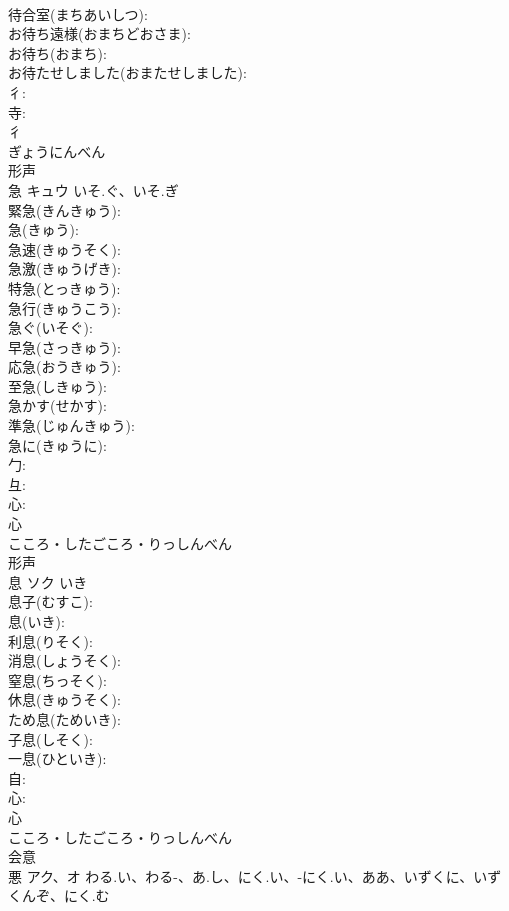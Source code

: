 \documentclass[8pt]{extreport}
\begin{document}
\begin{CJK}{UTF8}{min}
\\	待合室(まちあいしつ): 
\\	お待ち遠様(おまちどおさま): 
\\	お待ち(おまち): 
\\	お待たせしました(おまたせしました): 
\\	彳: 
\\	寺: 
\\	彳	
\\	ぎょうにんべん	
\\	形声 
\\	急	キュウ	いそ.ぐ、いそ.ぎ		
\\	緊急(きんきゅう): 
\\	急(きゅう): 
\\	急速(きゅうそく): 
\\	急激(きゅうげき): 
\\	特急(とっきゅう): 
\\	急行(きゅうこう): 
\\	急ぐ(いそぐ): 
\\	早急(さっきゅう): 
\\	応急(おうきゅう): 
\\	至急(しきゅう): 
\\	急かす(せかす): 
\\	準急(じゅんきゅう): 
\\	急に(きゅうに): 
\\	勹: 
\\	彑: 
\\	心: 
\\	心	
\\	こころ・したごころ・りっしんべん	
\\	形声 
\\	息	ソク	いき		
\\	息子(むすこ): 
\\	息(いき): 
\\	利息(りそく): 
\\	消息(しょうそく): 
\\	窒息(ちっそく): 
\\	休息(きゅうそく): 
\\	ため息(ためいき): 
\\	子息(しそく): 
\\	一息(ひといき): 
\\	自: 
\\	心: 
\\	心	
\\	こころ・したごころ・りっしんべん	
\\	会意 
\\	悪	アク、オ	わる.い、わる-、あ.し、にく.い、-にく.い、ああ、いずくに、いずくんぞ、にく.む		

\end{CJK}
\end{document}
